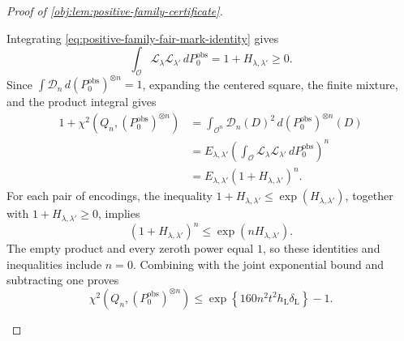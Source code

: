 \begin{proof}[Proof of \cref{obj:lem:positive-family-certificate}]
\begin{enumerate}
Integrating \cref{eq:positive-family-fair-mark-identity} gives
\[
\int_{\mathcal O}\mathscr L_\lambda\mathscr L_{\lambda'}
                      \,dP_0^{\mathrm{obs}}
=1+H_{\lambda,\lambda'}\ge0.
\]
Since \(\int\mathscr D_n\,d(P_0^{\mathrm{obs}})^{\otimes n}=1\),
expanding the centered square, the finite mixture, and the product
integral gives
\[
\begin{aligned}
1+\chi^2\!\left(Q_n,(P_0^{\mathrm{obs}})^{\otimes n}\right)
&=\int_{\mathcal O^n}\mathscr D_n(D)^2\,
                         d(P_0^{\mathrm{obs}})^{\otimes n}(D)\\
&=E_{\lambda,\lambda'}
 \left(\int_{\mathcal O}
       \mathscr L_\lambda\mathscr L_{\lambda'}\,dP_0^{\mathrm{obs}}
 \right)^n\\
&=E_{\lambda,\lambda'}(1+H_{\lambda,\lambda'})^n.
\end{aligned}
\]
For each pair of encodings, the inequality \(1+H_{\lambda,\lambda'}
\le\exp(H_{\lambda,\lambda'})\), together with
\(1+H_{\lambda,\lambda'}\ge0\), implies
\[
(1+H_{\lambda,\lambda'})^n
\le\exp(nH_{\lambda,\lambda'}).
\]
The empty product and every zeroth power equal \(1\), so these
identities and inequalities include \(n=0\). Combining with the joint
exponential bound and subtracting one proves
\[
\chi^2\!\left(Q_n,(P_0^{\mathrm{obs}})^{\otimes n}\right)
\le
\exp\!\left\{160n^2t^2h_{\mathrm L}\delta_{\mathrm L}\right\}-1.
\]


\end{enumerate}
\end{proof}
